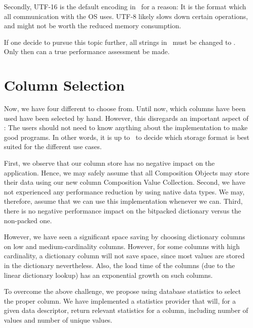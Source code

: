 Secondly, UTF-16 is the default encoding in \delphi~for a reason: It is the format which all communication with the OS uses. UTF-8 likely slows down certain operations, and might not be worth the reduced memory consumption.

If one decide to pursue this topic further, all strings in \gap~must be changed to . Only then can a true performance assessment be made.

\section{Column Selection}
\label{sec:Column Selection}
Now, we have four different  to choose from. Until now, which columns have been used have been selected by hand. However, this disregards an important aspect of \mdd: The users should not need to know anything about the implementation to make good programs. In other words, it is up to \gap~to decide which storage format is best suited for the different use cases.

First, we observe that our column store has no negative impact on the application. Hence, we may safely assume that all Composition Objects may store their data using our new column Composition Value Collection. Second, we have not experienced any performance reduction by using native data types. We may, therefore, assume that we can use this implementation whenever we can. Third, there is no negative performance impact on the bitpacked dictionary versus the non-packed one.

However, we have seen a significant space saving by choosing dictionary columns on low and medium-cardinality columns. However, for some columns with high cardinality, a dictionary column will not save space, since most values are stored in the dictionary nevertheless. Also, the load time of the columns (due to the linear dictionary lookup) has an exponential growth on such columns.


To overcome the above challenge, we propose using database statistics to select the proper column. We have implemented a statistics provider that will, for a given data descriptor, return relevant statistics for a column, including number of values and number of unique values.

